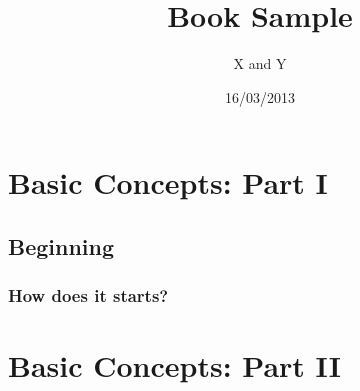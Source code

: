 \documentclass[twoside,a4paper,10pt]{book}
\title{Book Sample}
\author{X and Y}
\date{16/03/2013}
\begin{document}
\maketitle

\tableofcontents %

\part{Basic Concepts: Part I}
\chapter{Beginning}
\section{How does it starts?}

\part{Basic Concepts: Part II}
\end{document}
